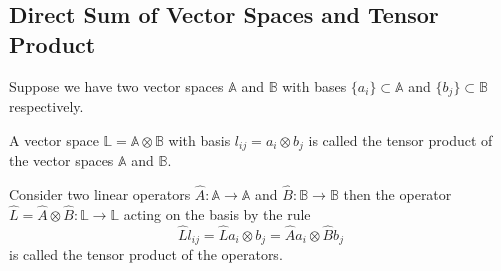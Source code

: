 \subsection{Direct Sum of Vector Spaces and Tensor Product}

Suppose we have two vector spaces $\mathbb{A}$ and 
$\mathbb{B}$ with bases $\{a_i\} \subset \mathbb{A}$ and
$\{b_j\} \subset \mathbb{B}$ respectively. 

\begin{definition}
A vector space $\mathbb{L} = \mathbb{A} \otimes \mathbb{B}$ with
basis $l_{ij} = a_i \otimes b_j$ is called the tensor product
of the vector spaces $\mathbb{A}$ and $\mathbb{B}$. 
\end{definition}

\begin{definition}
\label{def:tensorprod}
Consider two linear operators $\hat{A}: \mathbb{A} \to \mathbb{A}$
and $\hat{B} : \mathbb{B} \to \mathbb{B}$ then the operator 
$\hat{L} = \hat{A} \otimes \hat{B} : \mathbb{L} \to \mathbb{L}$
acting on the basis by the rule
\[
\hat{L} l_{ij} = 
\hat{L} a_i \otimes b_j = 
\hat{A} a_i \otimes \hat{B} b_j
\]
is called the tensor product of the operators.
\end{definition}